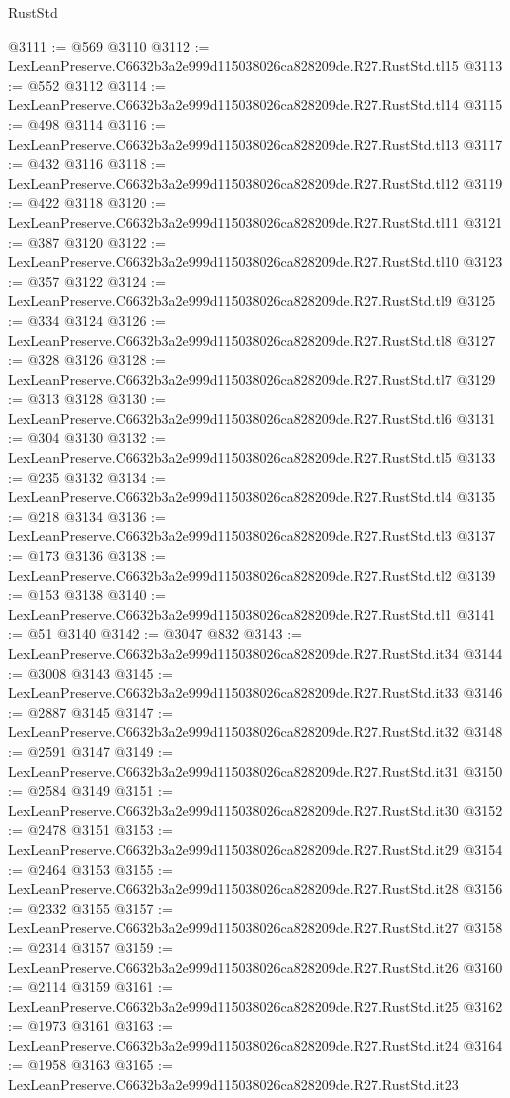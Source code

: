 \begin{lexlean}{RustStd}
\begin{coremodule}
@3111 := @569 @3110
@3112 := LexLeanPreserve.C6632b3a2e999d115038026ca828209de.R27.RustStd.tl15
@3113 := @552 @3112
@3114 := LexLeanPreserve.C6632b3a2e999d115038026ca828209de.R27.RustStd.tl14
@3115 := @498 @3114
@3116 := LexLeanPreserve.C6632b3a2e999d115038026ca828209de.R27.RustStd.tl13
@3117 := @432 @3116
@3118 := LexLeanPreserve.C6632b3a2e999d115038026ca828209de.R27.RustStd.tl12
@3119 := @422 @3118
@3120 := LexLeanPreserve.C6632b3a2e999d115038026ca828209de.R27.RustStd.tl11
@3121 := @387 @3120
@3122 := LexLeanPreserve.C6632b3a2e999d115038026ca828209de.R27.RustStd.tl10
@3123 := @357 @3122
@3124 := LexLeanPreserve.C6632b3a2e999d115038026ca828209de.R27.RustStd.tl9
@3125 := @334 @3124
@3126 := LexLeanPreserve.C6632b3a2e999d115038026ca828209de.R27.RustStd.tl8
@3127 := @328 @3126
@3128 := LexLeanPreserve.C6632b3a2e999d115038026ca828209de.R27.RustStd.tl7
@3129 := @313 @3128
@3130 := LexLeanPreserve.C6632b3a2e999d115038026ca828209de.R27.RustStd.tl6
@3131 := @304 @3130
@3132 := LexLeanPreserve.C6632b3a2e999d115038026ca828209de.R27.RustStd.tl5
@3133 := @235 @3132
@3134 := LexLeanPreserve.C6632b3a2e999d115038026ca828209de.R27.RustStd.tl4
@3135 := @218 @3134
@3136 := LexLeanPreserve.C6632b3a2e999d115038026ca828209de.R27.RustStd.tl3
@3137 := @173 @3136
@3138 := LexLeanPreserve.C6632b3a2e999d115038026ca828209de.R27.RustStd.tl2
@3139 := @153 @3138
@3140 := LexLeanPreserve.C6632b3a2e999d115038026ca828209de.R27.RustStd.tl1
@3141 := @51 @3140
@3142 := @3047 @832
@3143 := LexLeanPreserve.C6632b3a2e999d115038026ca828209de.R27.RustStd.it34
@3144 := @3008 @3143
@3145 := LexLeanPreserve.C6632b3a2e999d115038026ca828209de.R27.RustStd.it33
@3146 := @2887 @3145
@3147 := LexLeanPreserve.C6632b3a2e999d115038026ca828209de.R27.RustStd.it32
@3148 := @2591 @3147
@3149 := LexLeanPreserve.C6632b3a2e999d115038026ca828209de.R27.RustStd.it31
@3150 := @2584 @3149
@3151 := LexLeanPreserve.C6632b3a2e999d115038026ca828209de.R27.RustStd.it30
@3152 := @2478 @3151
@3153 := LexLeanPreserve.C6632b3a2e999d115038026ca828209de.R27.RustStd.it29
@3154 := @2464 @3153
@3155 := LexLeanPreserve.C6632b3a2e999d115038026ca828209de.R27.RustStd.it28
@3156 := @2332 @3155
@3157 := LexLeanPreserve.C6632b3a2e999d115038026ca828209de.R27.RustStd.it27
@3158 := @2314 @3157
@3159 := LexLeanPreserve.C6632b3a2e999d115038026ca828209de.R27.RustStd.it26
@3160 := @2114 @3159
@3161 := LexLeanPreserve.C6632b3a2e999d115038026ca828209de.R27.RustStd.it25
@3162 := @1973 @3161
@3163 := LexLeanPreserve.C6632b3a2e999d115038026ca828209de.R27.RustStd.it24
@3164 := @1958 @3163
@3165 := LexLeanPreserve.C6632b3a2e999d115038026ca828209de.R27.RustStd.it23

\end{coremodule}
\end{lexlean}
